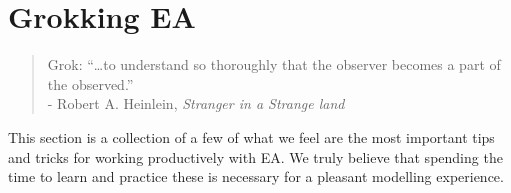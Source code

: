 \newpage
\section{Grokking EA}
\visHeader

\vspace*{0.5cm}

\begin{quote} {\small Grok: ``\ldots to understand so thoroughly that the observer becomes a part of the observed.''\\
\hspace*{3.2cm} - Robert A. Heinlein, \emph{Stranger in a Strange land}}
\end{quote}

\vspace{0.5cm}

This section is a collection of a few of what we feel are the most important tips and tricks for working productively with EA. 
We truly believe that spending the time to learn and practice these is necessary for a pleasant modelling experience.

\vspace{0.5cm}
















